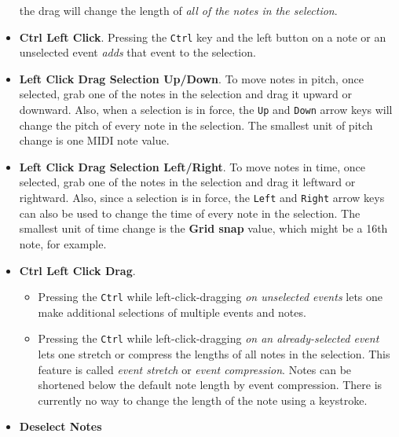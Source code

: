\begin{itemize}
         the drag will change the length of
         \textsl{all of the notes in the selection}.
      \item {}
         \textbf{Ctrl Left Click}.
         Pressing the \texttt{Ctrl} key and the left button on a note or an
         unselected event \textsl{adds} that event to the selection.
      \item
         \textbf{Left Click Drag Selection Up/Down}.
         To move notes in pitch, once selected, grab one of the notes in the
         selection and drag it upward or downward.
         Also, when a selection is in force, the
         \texttt{Up} and \texttt{Down} arrow keys will
         change the pitch of every note in the selection.
         The smallest unit of pitch change is one MIDI note value.
      \item
         \textbf{Left Click Drag Selection Left/Right}.
         To move notes in time, once selected, grab one of the notes in the
         selection and drag it leftward or rightward.
         Also, since a selection is in force, the
         \texttt{Left} and \texttt{Right} arrow keys can also
         be used to change the time of every note in the selection.
         The smallest unit of time change is the \textbf{Grid snap} value,
         which might be a 16th note, for example.
      \item
         \textbf{Ctrl Left Click Drag}.
         \begin{itemize}
            \item Pressing the \texttt{Ctrl} while left-click-dragging
               \textsl{on unselected events} lets one make additional
               selections of multiple events and notes.
            \item Pressing the \texttt{Ctrl} while left-click-dragging
               \textsl{on an already-selected event} lets one stretch or
               compress the lengths of all notes in the selection.
               This feature is called \textsl{event stretch}
               or \textsl{event compression}.
               Notes can be shortened below the default note length by event
               compression.  There is currently no way to change the length of
               the note using a keystroke.
         \end{itemize}
      \item {} 
         \textbf{Deselect Notes}
   \end{itemize}

